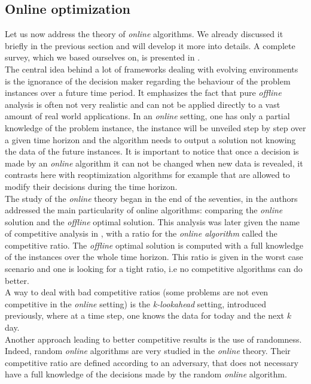 \documentclass[a4paper]{book}
\begin{document}
\subsection{Online optimization}
Let us now address the theory of \emph{online} algorithms. We already discussed it briefly in the previous section and will develop it more into details. A complete survey, which we based ourselves on, is presented in \cite{albers1997ptima}.\\
The central idea behind a lot of frameworks dealing with evolving environments is the ignorance of the decision maker regarding the behaviour of the problem instances over a future time period. It emphasizes the fact that pure \emph{offline} analysis is often not very realistic and can not be applied directly to a vast amount of real world applications. In an \emph{online} setting, one has only a partial knowledge of the problem instance, the instance will be unveiled step by step over a given time horizon and the algorithm needs to output a solution not knowing the data of the future instances. It is important to notice that once a decision is made by an \emph{online} algorithm it can not be changed when new data is revealed, it contrasts here with reoptimization algorithms for example that are allowed to modify their decisions during the time horizon. \\
The study of the \emph{online} theory began in the end of the seventies, in \cite{SleatorT85} the authors addressed the main particularity of online algorithms: comparing the \emph{online} solution and the \emph{offline} optimal solution. This analysis was later given the name of competitive analysis in \cite{KarlinMRS88}, with a ratio for the \emph{online algorithm} called the competitive ratio. The \emph{offline} optimal solution is computed with a full knowledge of the instances over the whole time horizon. This ratio is given in the worst case scenario and one is looking for a tight ratio, i.e no competitive algorithms can do better.\\
A way to deal with bad competitive ratios (some problems are not even competitive in the \emph{online} setting) is the \emph{k-lookahead} setting, introduced previously, where at a time step, one knows the data for today and the next $k$ day.\\
Another approach leading to better competitive results is the use of randomness. Indeed, random \emph{online} algorithms are very studied in the \emph{online} theory. Their competitive ratio are defined according to an adversary, that does not necessary have a full knowledge of the decisions made by the random \emph{online} algorithm.\\
\end{document}
